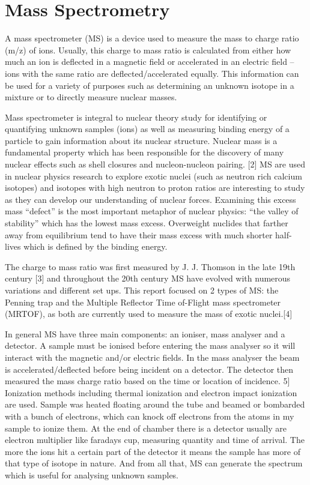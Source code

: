 \section{Mass Spectrometry}
A mass spectrometer (MS) is a device used to measure the mass to charge ratio (m/z) of ions.
Usually, this charge to mass ratio is calculated from either how much an ion is deflected in a magnetic field or accelerated in an electric field – ions with the same ratio are deflected/accelerated equally.
This information can be used for a variety of purposes such as determining an unknown isotope in a mixture or to directly measure nuclear masses.

Mass spectrometer is integral to nuclear theory study for identifying or quantifying unknown samples (ions) as well as measuring binding energy of a particle to gain information about its nuclear structure.
Nuclear mass is a fundamental property which has been responsible for the discovery of many nuclear effects such as shell closures and nucleon-nucleon pairing.
[2] MS are used in nuclear physics research to explore exotic nuclei (such as neutron rich calcium isotopes) and isotopes with high neutron to proton ratios are interesting to study as they can develop our understanding of nuclear forces.
Examining this excess mass “defect” is the most important metaphor of nuclear physics: “the valley of stability” which has the lowest mass excess.
Overweight nuclides that farther away from equilibrium tend to have their mass excess with much shorter half-lives which is defined by the binding energy.

The charge to mass ratio was first measured by J. J. Thomson in the late 19th century [3] and throughout the 20th century MS have evolved with numerous variations and different set ups.
This report focused on 2 types of MS: the Penning trap and the Multiple Reflector Time of-Flight mass spectrometer (MRTOF), as both are currently used to measure the mass of exotic nuclei.[4]

In general MS have three main components: an ioniser, mass analyser and a detector.
A sample must be ionised before entering the mass analyser so it will interact with the magnetic and/or electric fields.
In the mass analyser the beam is accelerated/deflected before being incident on a detector.
The detector then measured the mass charge ratio based on the time or location of incidence.
5] Ionization methods including thermal ionization and electron impact ionization are used.
Sample was heated floating around the tube and beamed or bombarded with a bunch of electrons, which can knock off electrons from the atoms in my sample to ionize them.
At the end of chamber there is a detector usually are electron multiplier like faradays cup, measuring quantity and time of arrival.
The more the ions hit a certain part of the detector it means the sample has more of that type of isotope in nature.
And from all that, MS can generate the spectrum which is useful for analysing unknown samples.

